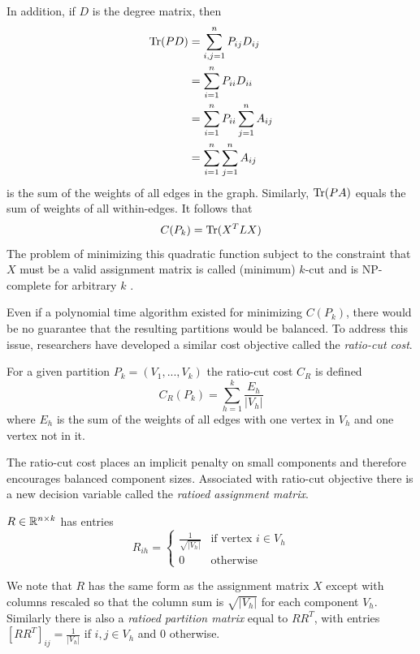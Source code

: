 In addition, if $D$ is the degree matrix, then
\begin{align*}
\operatorname{Tr}(P D) &= \sum_{i,j = 1}^n P_{ij} D_{ij} \\
         &= \sum_{i=1}^n P_{ii} D_{ii}  \\
         &= \sum_{i=1}^n P_{ii} \sum_{j=1}^n A_{ij} \\
         &= \sum_{i=1}^n \sum_{j=1}^n A_{ij}
\end{align*}
is the sum of the weights of all edges in the graph.
Similarly, $\operatorname{Tr}(P A)$ equals the sum of weights of all within-edges.
It follows that 
\[ C(P_k) = \operatorname{Tr}(X^T L X) \]
The problem of minimizing this quadratic function subject to the
constraint that $X$ must be a valid assignment matrix is called
(minimum) $k$-cut and is NP-complete for arbitrary $k$
\cite{Goldschmidt:94}.

Even if a polynomial time algorithm existed for minimizing $C(P_k)$,
there would be no guarantee that the resulting partitions would
be balanced. To address this issue, researchers have developed
a similar cost objective called the \textit{ratio-cut cost}.

\begin{definition}
 For a given partition $P_k = (V_1, ..., V_k)$ the
ratio-cut cost $C_R$ is defined
\[ C_R(P_k) = \sum_{h=1}^k \frac{E_h}{|V_h|} \]
where $E_h$ is the sum of the weights of all edges with one vertex in
$V_h$ and one vertex not in it.
\end{definition}

The ratio-cut cost places an implicit penalty on small components
and therefore encourages balanced component sizes. Associated with
ratio-cut objective there is a new decision variable called the
\textit{ratioed assignment matrix}.

\begin{definition}
 $R \in \mathbb{R}^{n \times k}$ has entries
\[ R_{ih} = \begin{cases}
		\frac{1}{\sqrt{|V_h|}} & \mbox{if vertex } i \in V_h \\
		0 & \mbox{otherwise}
\end{cases} \]
\end{definition}

We note that $R$ has the same form as the assignment matrix $X$
except with columns rescaled so that the column sum is $\sqrt{|V_h|}$
for each component $V_h$. Similarly there is also a
\textit{ratioed partition matrix} equal to $R R^T$, with entries
$[R R^T]_{ij} = \frac{1}{|V_h|}$ if $i,j \in V_h$ and 0 otherwise.

